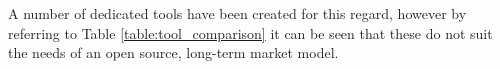 \documentclass[12pt]{article}
\begin{document}
A number of dedicated tools have been created for this regard, however by referring to Table \ref{table:tool_comparison} it can be seen that these do not suit the needs of an open source, long-term market model.










%
%
%
%
\end{document}
